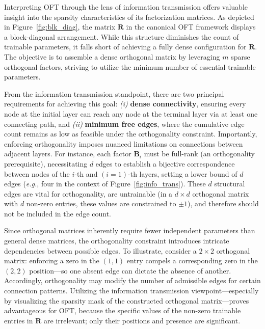 Interpreting OFT through the lens of information transmission offers valuable insight into the sparsity characteristics of its factorization matrices. As depicted in Figure~\ref{fig:blk_diag}, the matrix $\bm{R}$ in the canonical OFT framework displays a block-diagonal arrangement. While this structure diminishes the count of trainable parameters, it falls short of achieving a fully dense configuration for $\bm{R}$. The objective is to assemble a dense orthogonal matrix by leveraging $m$ sparse orthogonal factors, striving to utilize the minimum number of essential trainable parameters.

From the information transmission standpoint, there are two principal requirements for achieving this goal: \emph{(i)} \textbf{dense connectivity}, ensuring every node at the initial layer can reach any node at the terminal layer via at least one connecting path, and \emph{(ii)} \textbf{minimum free edges}, where the cumulative edge count remains as low as feasible under the orthogonality constraint. Importantly, enforcing orthogonality imposes nuanced limitations on connections between adjacent layers. For instance, each factor $\bm{B}_i$ must be full-rank (an orthogonality prerequisite), necessitating $d$ edges to establish a bijective correspondence between nodes of the $i$-th and $(i=1)$-th layers, setting a lower bound of $d$ edges (\emph{e.g.}, four in the context of Figure~\ref{fig:info_trans}). These $d$ structural edges are vital for orthogonality, are untrainable (in a $d\times d$ orthogonal matrix with $d$ non-zero entries, these values are constrained to $\pm 1$), and therefore should not be included in the edge count.

Since orthogonal matrices inherently require fewer independent parameters than general dense matrices, the orthogonality constraint introduces intricate dependencies between possible edges. To illustrate, consider a $2\times 2$ orthogonal matrix: enforcing a zero in the $(1,1)$ entry compels a corresponding zero in the $(2,2)$ position—so one absent edge can dictate the absence of another. Accordingly, orthogonality may modify the number of admissible edges for certain connection patterns. Utilizing the information transmission viewpoint—especially by visualizing the sparsity mask of the constructed orthogonal matrix—proves advantageous for OFT, because the specific values of the non-zero trainable entries in $\bm{R}$ are irrelevant; only their positions and presence are significant.

